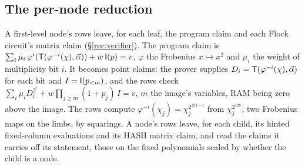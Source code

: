 \subsection{The per-node reduction}\label{rec:reduce}

A first-level node's rows leave, for each leaf, the program claim and each Flock circuit's matrix claim (\S\ref{rec:verifier}). The program claim is $\sum_i\mu_i\,\varphi^i(\mathsf{T}(\varphi^{-i}(\chi),\vec\alpha))+w\,\mathsf{I}(p)=v$, $\varphi$ the Frobenius $x\mapsto x^2$ and $\mu_i$ the weight of multiplicity bit $i$. It becomes point claims: the prover supplies $D_i=\mathsf{T}(\varphi^{-i}(\chi),\vec\alpha)$ for each bit and $I=\mathsf{I}(p_{<m})$, and the rows check $\sum_i\mu_iD_i^{2^i}+w\prod_{j\ge m}(1+p_j)\,I=v$, $m$ the image's variables, RAM being zero above the image. The rows compute $\varphi^{-i}(\chi_j)=\chi_j^{2^{192-i}}$ from $\chi_j^{2^{128}}$, two Frobenius maps on the limbs, by squarings. A node's rows leave, for each child, its hinted fixed-column evaluations and its \textsf{HASH} matrix claim, and read the claims it carries off its statement, those on the fixed polynomials scaled by whether the child is a node.

